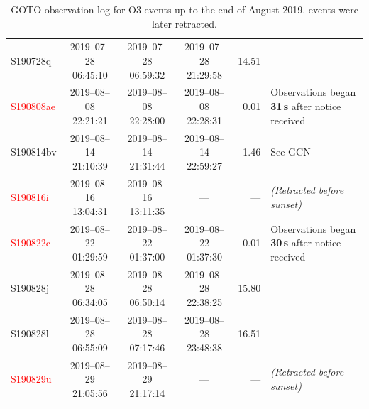 \begin{colsection}
\begin{colsection}
\begin{table}
\begin{footnotesize}
\begin{center}
\begin{tabular}{l|cccrl}
            \\
            S190728q &
            2019--07--28 06:45:10 &
            2019--07--28 06:59:32 &
            2019--07--28 21:29:58 &
            14.51 &

            \\
            \textcolor{Red}{S190808ae} &
            2019--08--08 22:21:21 &
            2019--08--08 22:28:00 &
            2019--08--08 22:28:31 &
            0.01 &
            Observations began \textbf{31\,s} after notice received
            \\
            S190814bv &
            2019--08--14 21:10:39 &
            2019--08--14 21:31:44 &
            2019--08--14 22:59:27 &
            1.46 &
            See GCN \citet{GW190814_GOTO}
            \\
            \textcolor{Red}{S190816i} &
            2019--08--16 13:04:31 &
            2019--08--16 13:11:35 &
            --- &
            --- &
            \textit{(Retracted before sunset)}
            \\
            \textcolor{Red}{S190822c} &
            2019--08--22 01:29:59 &
            2019--08--22 01:37:00 &
            2019--08--22 01:37:30 &
            0.01 &
            Observations began \textbf{30\,s} after notice received
            \\
            S190828j &
            2019--08--28 06:34:05 &
            2019--08--28 06:50:14 &
            2019--08--28 22:38:25 &
            15.80 &

            \\
            S190828l &
            2019--08--28 06:55:09 &
            2019--08--28 07:17:46 &
            2019--08--28 23:48:38 &
            16.51 &

            \\
            \textcolor{Red}{S190829u} &
            2019--08--29 21:05:56 &
            2019--08--29 21:17:14 &
            --- &
            --- &
            \textit{(Retracted before sunset)}
            \\

        \end{tabular}
    \end{center}
    \end{footnotesize}
    \caption[GOTO observation log for O3 events so far]{
        GOTO observation log for O3 events up to the end of August 2019.  events were later retracted.
    }\label{tab:obs_log}
\end{table}


\end{colsection}
\end{colsection}
